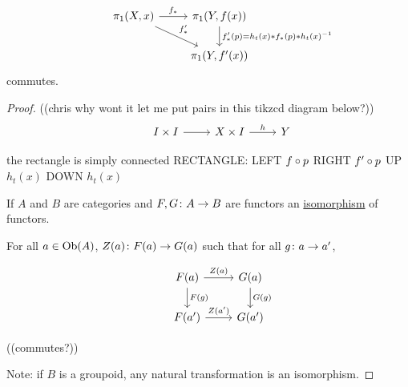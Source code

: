 \documentclass[11pt,leqno,oneside]{amsart}
\numberwithin{thm}{section}
\newcommand{\fund}[1][1]{\pi_{#1}}
\newcommand{\x}{\times}
\newcommand{\id}{\text{id}}
\begin{document}
\begin{thm}
  $$\begin{tikzcd}
    &\fund(X,x) \arrow[r, "f_*"] \arrow[rd, "f'_*"] &\fund(Y,f(x)) \arrow[d, "f_*'(p) = h_t(x) * f_*(p) * h_t(x)^{-1}"] \\
    & &\fund(Y, f'(x))
  \end{tikzcd}$$
  commutes.
\end{thm}
\begin{proof}
  ((chris why wont it let me put pairs in this tikzcd diagram below?))
  $$\begin{tikzcd}
    &I \x I \arrow[r, ""] &X \x I \arrow[r, "h"] &Y
  \end{tikzcd}$$

  the rectangle is simply connected
  RECTANGLE:
  LEFT
  $f \circ p$
  RIGHT
  $f' \circ p$
  UP
  $h_t(x)$
  DOWN
  $h_t(x)$

  If $A$ and $B$ are categories and $F,G\colon A \to B$ are functors an \underline{isomorphism} of functors.

  For all $a \in \text{Ob}(A)$, $Z(a)\colon F(a) \to G(a)$ such that for all $g \colon a \to a'$,

  $$\begin{tikzcd}
    &F(a) \arrow[r, "Z(a)"] \arrow[d, "F(g)"] & G(a) \arrow[d, "G(g)"] \\
    &F(a') \arrow[r, "Z(a')"]                  & G(a')
  \end{tikzcd}$$

  ((commutes?))

  Note: if $B$ is a groupoid, any natural transformation is an isomorphism.
\end{proof}
\end{document}
